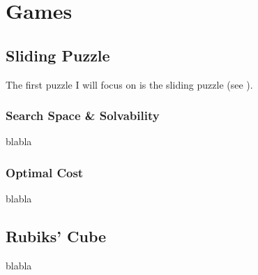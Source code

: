 
\chapter{Games} %

\label{sec:Games} %

\section{Sliding Puzzle}

The first puzzle I will focus on is the sliding puzzle (see \cite{SlidingPuzzle}).




\subsection{Search Space \& Solvability}

blabla


\subsection{Optimal Cost}

blabla



\section{Rubiks' Cube}

blabla

